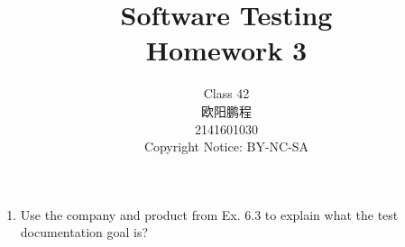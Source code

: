 \documentclass{article}
\title{Software Testing \\ Homework 3}
\author{Class 42 \\ 欧阳鹏程 \\ 2141601030 \\ Copyright Notice: BY-NC-SA}
\begin{document}
	\maketitle
	\begin{enumerate}
		\item Use the company and product from Ex. 6.3 to explain what the test documentation goal is?
		
	\end{enumerate}
\end{document}
